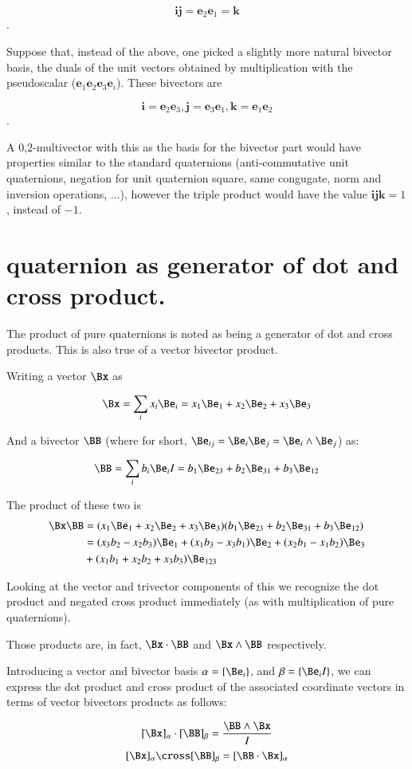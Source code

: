 \[
\mathbf{i}\mathbf{j} = \mathbf{e}_2\mathbf{e}_1 = \mathbf{k}
\].

Suppose that, instead of the above, one picked a slightly more natural bivector basis, the duals of the unit vectors obtained by multiplication with the pseudoscalar ($\mathbf{e}_1\mathbf{e}_2\mathbf{e}_3\mathbf{e}_i$).  These bivectors are

\[
\mathbf{i}=\mathbf{e}_2\mathbf{e}_3, \mathbf{j}=\mathbf{e}_3\mathbf{e}_1, \mathbf{k}=\mathbf{e}_1\mathbf{e}_2
\].

A 0,2-multivector with this as the basis for the bivector part would have properties similar to the standard quaternions (anti-commutative unit quaternions, negation for unit quaternion square, same congugate, norm and inversion operations, ...), however the triple product would have the value $\mathbf{i}\mathbf{j}\mathbf{k} = 1$, instead of $-1$.

\section{quaternion as generator of dot and cross product. }

The product of pure quaternions is noted as being a generator of dot and cross products.  This is also true
of a vector bivector product.

Writing a vector $\Bx$ as

\[
\Bx = \sum_i x_i \Be_i = x_1 \Be_1 + x_2 \Be_2 + x_3 \Be_3
\]

And a bivector $\BB$ (where for short, $\Be_{ij} = \Be_i \Be_j = \Be_i \wedge \Be_j$) as:

\[
\BB = \sum_i b_i \Be_i I = b_1 \Be_{23} + b_2 \Be_{31} + b_3 \Be_{12}
\]

The product of these two is
\begin{align*}
\Bx \BB 
&= (x_1 \Be_1 + x_2 \Be_2 + x_3 \Be_3)(b_1 \Be_{23} + b_2 \Be_{31} + b_3 \Be_{12}) \\
&= (x_3 b_2 - x_2 b_3) \Be_1 + (x_1 b_3 - x_3 b_1) \Be_2 + (x_2 b_1 - x_1 b_2) \Be_3 \\
&+ (x_1 b_1 + x_2 b_2 + x_3 b_3) \Be_{123} \\
\end{align*}

Looking at the vector and trivector components of this we recognize the dot product and negated cross product
immediately (as with multiplication of pure quaternions).

Those products are, in fact, $\Bx \cdot \BB$ and $\Bx \wedge \BB$ respectively.

Introducing a vector and bivector basis $\alpha = \{ \Be_i \}$, and $\beta = \{ \Be_i I \}$, we can
express the dot product and cross product of the associated coordinate vectors
in terms of vector bivectors products as follows:

\[
[\Bx]_\alpha \cdot [\BB]_\beta = \frac{\BB \wedge \Bx}{I}
\]
\[
[\Bx]_\alpha \cross [\BB]_\beta = [\BB \cdot \Bx]_\alpha
\]

